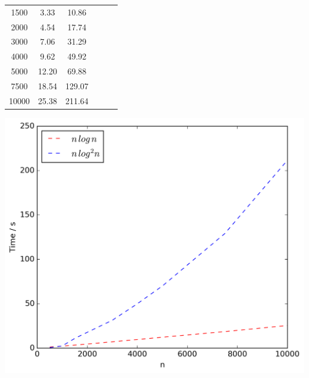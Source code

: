 \documentclass{article}
\begin{document}
\begin{table}[!ht]
\begin{minipage}{0.48\textwidth}
\begin{tabular}{c||ccccc}
                1500 & 3.33 & 10.86\\
                2000 & 4.54 & 17.74\\
                3000 & 7.06 & 31.29\\
                4000 & 9.62 & 49.92\\
                5000 & 12.20 & 69.88\\
                7500 & 18.54 & 129.07\\
                10000 & 25.38 & 211.64\\
            \end{tabular}
            \includegraphics[scale=0.4]{varyingn1_filter}
        \end{minipage}
        \label{fig:expresults1}
    \end{table}
\end{document}
